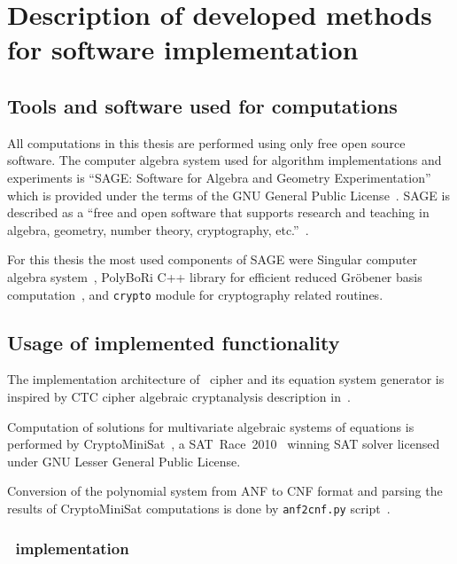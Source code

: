 
\chapter{Description of developed methods for software implementation}
\label{sec:implementation}

\section{Tools and software used for computations}
\label{sec:soft-and-tools}

All computations in this thesis are performed using only free open source
software. The computer algebra system used for algorithm implementations and
experiments is ``SAGE: Software for Algebra and Geometry Experimentation''
which is provided under the terms of the GNU General Public
License~\cite{sage}. SAGE is described as a ``free and open software that
supports research and teaching in algebra, geometry, number theory,
cryptography, etc.''~\cite{sage-core}.

For this thesis the most used components of SAGE were Singular
computer algebra system~\cite{singular}, PolyBoRi C++ library for efficient
reduced Gr\"obener basis computation~\cite{polybori}, and \verb+crypto+ module for cryptography
related routines.


\section{Usage of implemented functionality}
\label{sec:soft-usage}

The implementation architecture of \gost\ cipher and its equation system
generator is inspired by CTC cipher algebraic cryptanalysis description
in~\cite{Albrecht2006}.

Computation of solutions for multivariate algebraic systems of equations is
performed by \mbox{CryptoMiniSat}~\cite{soos:cryptominisat}, a
SAT~Race~2010~\cite{satrace2010} winning SAT solver licensed under GNU Lesser
General Public License.

Conversion of the polynomial system from ANF to CNF format and parsing the
results of \mbox{CryptoMiniSat} computations is done by \verb+anf2cnf.py+
script~\cite{anf2cnf}.


\subsection{\gost\ implementation}
\label{sec:soft-gost}

